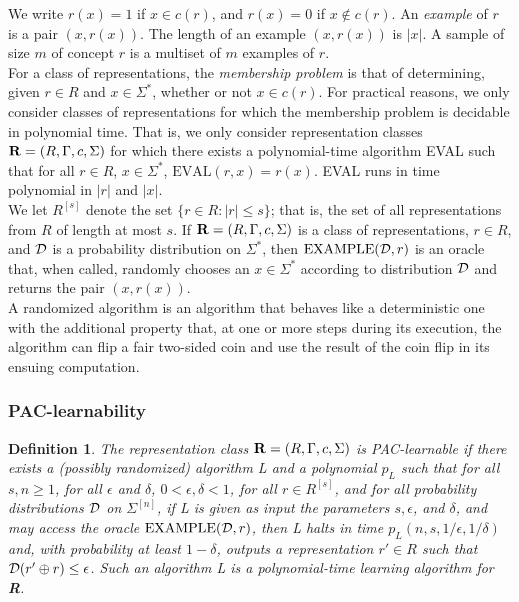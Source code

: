 \documentclass[12pt]{article}
\newtheorem{definition}[theorem]{Definition}
\newcommand{\cald}{{\cal D}}
\begin{document}
We write $r(x) = 1$ if $x \in c(r)$, and $r(x) = 0$ if $x \notin c(r)$. An \emph {example} of $r$ is a pair $(x, r(x))$. The length of an example $(x, r(x))$ is $|x|$. A sample of size $m$ of concept $r$ is a multiset of $m$ examples of $r$. \\

For a class of representations, the \emph {membership problem} is that of determining, given $r \in R$ and $x \in \Sigma^*$, whether or not $x \in c(r)$. For practical reasons, we only consider classes of representations for which the membership problem is decidable in polynomial time. That is, we only consider representation classes ${\bf R} = (R, \Gamma, c, \Sigma)$ for which there exists a polynomial-time algorithm EVAL such that for all $r \in R$, $x \in \Sigma^*$, $\text {EVAL}(r, x) = r(x)$. EVAL runs in time polynomial in $|r|$ and $|x|$. \\

We let $R^{[s]}$ denote the set $\{ r \in R: |r| \le s\}$; that is, the set of all representations from $R$ of length at most $s$. If ${\bf R} = (R, \Gamma, c, \Sigma)$ is a class of representations, $r \in R$, and $\cald$ is a probability distribution on $\Sigma^*$, then $\text{EXAMPLE}(\cald, r)$ is an oracle that, when called, randomly chooses an $x \in \Sigma^*$ according to distribution $\cald$ and returns the pair $(x, r(x))$. \\

A randomized algorithm is an algorithm that behaves like a deterministic one with the additional property that, at one or more steps during its execution, the algorithm can flip a fair two-sided coin and use the result of the coin flip in its ensuing computation.

\subsubsection{PAC-learnability}

\begin{definition} \label {definition:pac}
The representation class ${\bf R} = (R, \Gamma, c, \Sigma)$ is PAC-\emph {learnable} if there exists a (possibly randomized) algorithm L and a polynomial $p_L$ such that for all $s, n \ge 1$, for all $\epsilon$ and $\delta$, $0 < \epsilon, \delta < 1$, for all $r \in R^{[s]}$, and for all probability distributions $\cald$ on $\Sigma^{[n]}$, if L is given as input the parameters $s, \epsilon$, and $\delta$, and may access the oracle $\text {EXAMPLE}(\cald, r)$, then L halts in time $p_L(n, s, 1/\epsilon, 1/\delta)$ and, with probability at least $1 - \delta$, outputs a representation $r' \in R$ such that $\cald (r' \oplus r) \le \epsilon$. Such an algorithm L is a polynomial-time learning algorithm for {\bf R}.
\end{definition}
\end{document}
